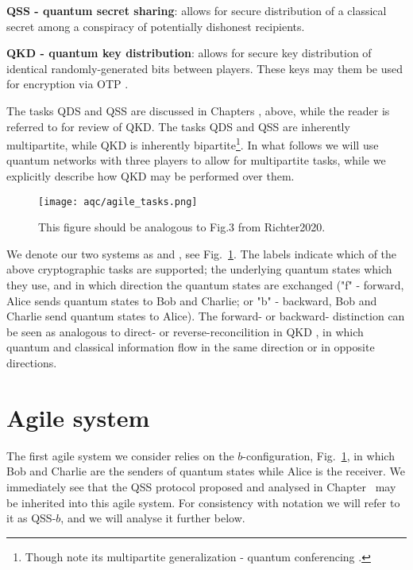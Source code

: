 \textbf{QSS - quantum secret sharing}: allows for secure distribution of a classical secret among a conspiracy of potentially dishonest recipients.

\textbf{QKD - quantum key distribution}: allows for secure key distribution of identical randomly-generated bits between players. These keys may them be used for encryption via OTP .

The tasks QDS and QSS are discussed in Chapters , above, while the reader is referred to  for review of QKD. The tasks QDS and QSS are inherently multipartite, while QKD is inherently bipartite\footnote{Though note its multipartite generalization - quantum conferencing .}. In what follows we will use quantum networks with three players to allow for multipartite tasks, while we explicitly describe how QKD may be performed over them.

\begin{figure}[htp]
\centering
\texttt{[image: aqc/agile\_tasks.png]}
\caption{\label{fig:agile_tasks} This figure should be analogous to Fig.3 from Richter2020.}
\end{figure}

We denote our two systems as \systemB and \systemF, see Fig.~\ref{fig:agile_tasks}. The labels indicate which of the above cryptographic tasks are supported; the underlying quantum states which they use, and in which direction the quantum states are exchanged ("f" - forward, Alice sends quantum states to Bob and Charlie; or "b" - backward, Bob and Charlie send quantum states to Alice). The forward- or backward- distinction can be seen as analogous to direct- or reverse-reconcilition in QKD , in which quantum and classical information flow in the same direction or in opposite directions.





\section{Agile system \systemB}
The first agile system we consider relies on the $b$-configuration, Fig.~\ref{fig:agile_tasks}, in which Bob and Charlie are the senders of quantum states while Alice is the receiver. We immediately see that the QSS protocol proposed and analysed in Chapter~ may be inherited into this agile system. For consistency with notation we will refer to it as QSS-$b$, and we will analyse it further below.

